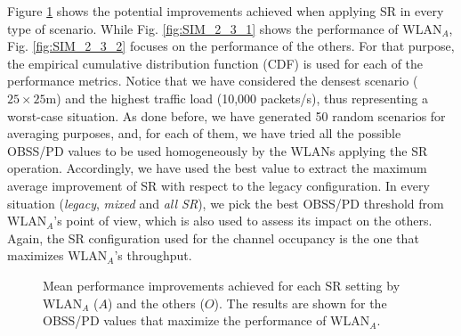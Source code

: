 \documentclass[preprint,12pt]{elsarticle}
\begin{document}
	Figure \ref{fig:SIM_2_3} shows the potential improvements achieved when applying SR in every type of scenario. While Fig. \ref{fig:SIM_2_3_1} shows the performance of WLAN$_A$, Fig. \ref{fig:SIM_2_3_2} focuses on the performance of the others. For that purpose, the empirical cumulative distribution function (CDF) is used for each of the performance metrics. Notice that we have considered the densest scenario ($25\times25$m) and the highest traffic load (10,000 packets/s), thus representing a worst-case situation. As done before, we have generated 50 random scenarios for averaging purposes, and, for each of them, we have tried all the possible OBSS/PD values to be used homogeneously by the WLANs applying the SR operation. Accordingly, we have used the best value to extract the maximum average improvement of SR with respect to the legacy configuration. In every situation (\emph{legacy}, \emph{mixed} and \emph{all SR}), we pick the best OBSS/PD threshold from $\text{WLAN}_A$'s point of view, which is also used to assess its impact on the others. Again, the SR configuration used for the channel occupancy is the one that maximizes $\text{WLAN}_A$'s throughput.
	
	\begin{figure}[ht!]
		\centering		
		\caption{Mean performance improvements achieved for each SR setting by WLAN$_A$ ($A$) and the others ($O$). The results are shown for the OBSS/PD values that maximize the performance of WLAN$_A$.}\label{fig:SIM_2_3}
	\end{figure}
	
\end{document}
